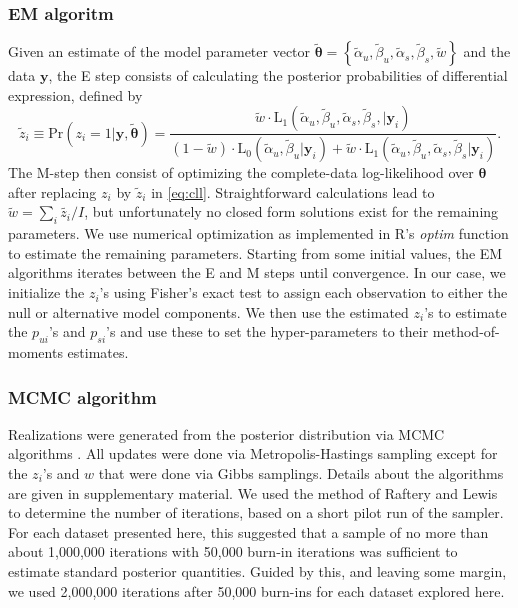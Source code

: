 \documentclass[11pt]{article}
\begin{document}
\subsubsection{EM algoritm}
Given an estimate of the model parameter vector $\tilde{\boldsymbol{\theta}}=\left\{\tilde{\alpha}_u,\tilde{\beta}_u,\tilde{\alpha}_s,\tilde{\beta}_s,\tilde{w}\right\}$ and the data $\mathbf{y}$, the E step consists of calculating the posterior probabilities of differential expression, defined by
\[
\tilde z_{i} \equiv \mathrm{Pr}(z_i=1|\mathbf{y},\tilde{\boldsymbol{\theta}})=\frac{\tilde{w} \cdot \mathrm{L}_1(\tilde{\alpha}_u,\tilde{\beta}_u,\tilde{\alpha}_s,\tilde{\beta}_s,|\mathbf{y}_i)}{(1-\tilde{w})\cdot\mathrm{L}_0(\tilde{\alpha}_u,\tilde{\beta}_u|\mathbf{y}_i)+\tilde{w}\cdot\mathrm{L}_1(\tilde{\alpha}_u,\tilde{\beta}_u,\tilde{\alpha}_s,\tilde{\beta}_s|\mathbf{y}_i)}.
\] 
The M-step then consist of optimizing the complete-data log-likelihood over $\boldsymbol{\theta}$ after replacing $z_i$ by $\tilde{z}_{i}$ in \eqref{eq:cll}. Straightforward calculations lead to 
$\tilde w = \sum_i{\tilde{z_i}}/I$, but unfortunately no closed form solutions exist for the remaining parameters. We use numerical optimization as implemented in R's \textit{optim} function to estimate the remaining parameters.  Starting from some initial values, the EM algorithms iterates between the E and M steps until convergence. In our case, we initialize the $z_{i}$'s using Fisher's exact test to assign each observation to either the null or alternative model components. We then use the estimated $z_i$'s to estimate the $p_{ui}$'s and $p_{si}$'s and use these to set the hyper-parameters to their method-of-moments estimates.

\subsubsection{MCMC algorithm}
Realizations were generated from the posterior distribution via MCMC algorithms \citep{Gelfand:1996wc}. All updates were done via Metropolis-Hastings sampling except for the $z_i$'s and $w$ that were done via Gibbs samplings.
Details about the algorithms are given in supplementary material. We used the method of Raftery and Lewis \citep{Raftery:1992vp,Raftery:1996ws} to determine the number of iterations, based on a short pilot run of the sampler. For each dataset presented here, this suggested that a sample of no more than about 1,000,000 iterations with 50,000 burn-in iterations was sufficient to estimate standard posterior quantities. Guided by this, and leaving some margin, we used 2,000,000 iterations after 50,000  burn-ins for each dataset explored here. 
\end{document}
